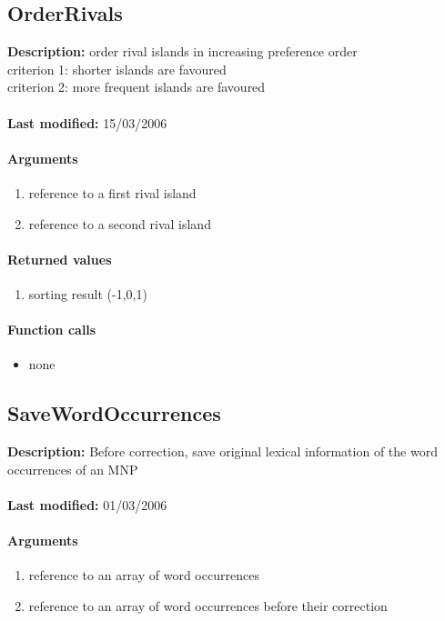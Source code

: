 \subsection{OrderRivals}
\textbf{Description:} order rival islands in increasing preference order\\
criterion 1: shorter islands are favoured\\
criterion 2: more frequent islands are favoured\\
\\\textbf{Last modified:} 15/03/2006

\paragraph{Arguments}
\begin{enumerate}
\item reference to a first rival island
\item reference to a second rival island
\end{enumerate}

\paragraph{Returned values}
\begin{enumerate}
\item sorting result (-1,0,1)
\end{enumerate}

\paragraph{Function calls}
\begin{itemize}
\item none
\end{itemize}

\subsection{SaveWordOccurrences}
\textbf{Description:} Before correction, save original lexical information of the word occurrences of an MNP\\
\\\textbf{Last modified:} 01/03/2006

\paragraph{Arguments}
\begin{enumerate}
\item reference to an array of word occurrences
\item reference to an array of word occurrences before their correction
\end{enumerate}

